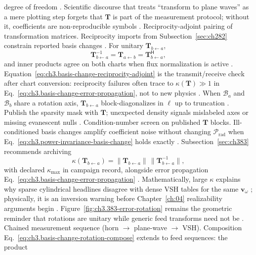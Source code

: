 degree of freedom \cite{harrington2001}. Scientific discourse that treats ``transform to plane waves'' as a
mere plotting step forgets that \(\mathbf{T}\) is part of the measurement protocol; without it, coefficients are
non-reproducible symbols \cite{harrington2001}.
Reciprocity-adjoint pairing of transformation matrices. Reciprocity imports from Subsection~\ref{sec:ch282} constrain reported basis changes \cite{stratton1941}. For unitary \(\mathbf{T}_{b\leftarrow a}\),
\begin{equation}
\label{eq:ch3.basis-change-reciprocity-adjoint}
\mathbf{T}_{b\leftarrow a}^{-1}
=
\mathbf{T}_{a\leftarrow b}
=
\mathbf{T}_{b\leftarrow a}^{\mathsf{H}},
\end{equation}
and inner products agree on both charts when flux normalization is active \cite{hansen1988}. Equation~\eqref{eq:ch3.basis-change-reciprocity-adjoint} is the transmit/receive check after chart conversion: reciprocity failures often trace to \(\kappa(\mathbf{T})\gg1\) in Eq.~\eqref{eq:ch3.basis-change-error-propagation}, not to new physics \cite{harrington2001}.
When \(\mathcal{B}_{a}\) and \(\mathcal{B}_{b}\) share a rotation axis, \(\mathbf{T}_{b\leftarrow a}\) block-diagonalizes in \(\ell\) up to truncation \cite{jackson1999}. Publish the sparsity mask with \(\mathbf{T}\); unexpected density signals mislabeled axes or missing evanescent nulls \cite{stratton1941}.
Condition-number screen on published $\mathbf{T}$ blocks. Ill-conditioned basis changes amplify coefficient noise without changing \(\mathcal{P}_{\mathrm{rad}}\) when Eq.~\eqref{eq:ch3.power-invariance-basis-change} holds exactly
\cite{hansen1988}. Subsection~\ref{sec:ch383} recommends archiving
\begin{equation}
\label{eq:ch3.basis-change-condition-audit}
\kappa(\mathbf{T}_{b\leftarrow a})
=
\|\mathbf{T}_{b\leftarrow a}\|\,\|\mathbf{T}_{b\leftarrow a}^{-1}\|,
\end{equation}
with declared \(\kappa_{\max}\) in campaign record, alongside error propagation Eq.~\eqref{eq:ch3.basis-change-error-propagation} \cite{harrington2001}. Mathematically, large \(\kappa\) explains why sparse cylindrical headlines disagree with dense VSH tables for the same \(\mathbf{v}_\omega\)
\cite{jackson1999}; physically, it is an inversion warning before Chapter~\ref{ch:04} realizability arguments begin
\cite{devaney2004}. Figure~\ref{fig:ch3.383-error-rotation} remains the geometric reminder that rotations are unitary while generic feed transforms need not be
\cite{hansen1988}.
Chained measurement sequence (horn $\to$ plane-wave $\to$ VSH). Composition Eq.~\eqref{eq:ch3.basis-change-rotation-compose} extends to feed sequences: the product
